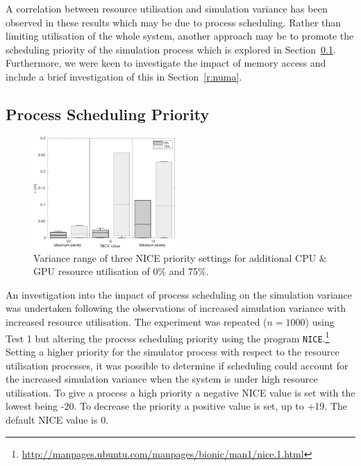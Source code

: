 \documentclass[letterpaper, 10 pt, journal, twoside]{IEEEtran}
\begin{document}
A correlation between resource utilisation and simulation variance has been observed in these results which may be due to process scheduling. Rather than limiting utilisation of the whole system, another approach may be to promote the scheduling priority of the simulation process which is explored in Section~\ref{r:process_scheduling}. Furthermore, we were keen to investigate the impact of memory access and include a brief investigation of this in Section~\ref{r:numa}. 
%


\subsection{Process Scheduling Priority} \label{r:process_scheduling}

\begin{figure}[t]
    \centering
    \includegraphics[width=0.48\textwidth]{Other/Figures/NICE_analysis_summary_V4.pdf}
    \caption{Variance range of three NICE priority settings for additional CPU \& GPU resource utilisation of 0\% and 75\%.}
    \label{NICEExperimentStressSummary}
\end{figure}

An investigation into the impact of process scheduling on the simulation variance was undertaken following the observations of increased simulation variance with increased resource utilisation. The experiment was repeated ($n=1000$) using Test 1 but altering the process scheduling priority using the program \texttt{NICE}.\footnote{\url{http://manpages.ubuntu.com/manpages/bionic/man1/nice.1.html}} Setting a higher priority for the simulator process with respect to the resource utilisation processes, it was possible to determine if scheduling could account for the increased simulation variance when the system is under high resource utilisation.
%
To give a process a high priority a negative NICE value is set with the lowest being -20. To decrease the priority a positive value is set, up to +19. The default NICE value is 0.
\end{document}
